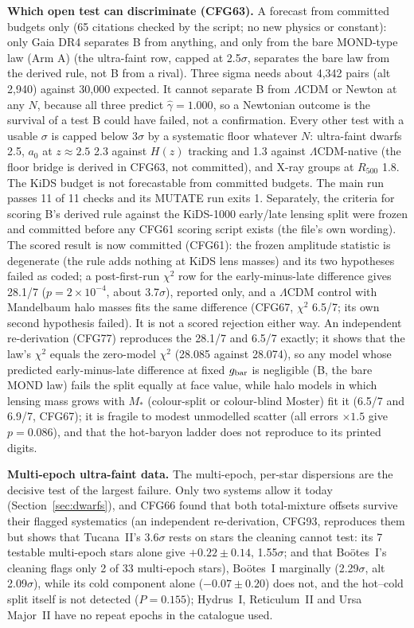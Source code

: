 \documentclass[10pt]{article}
\begin{document}
\textbf{Which open test can discriminate (CFG63).} A forecast from committed budgets only (65 citations checked by the script; no new physics or constant): only Gaia DR4 separates B from anything, and only from the bare MOND-type law (Arm A) (the ultra-faint row, capped at 2.5$\sigma$, separates the bare law from the derived rule, not B from a rival). Three sigma needs about 4,342 pairs (alt 2,940) against 30,000 expected. It cannot separate B from $\Lambda$CDM or Newton at any $N$, because all three predict $\hat\gamma=1.000$, so a Newtonian outcome is the survival of a test B could have failed, not a confirmation. Every other test with a usable $\sigma$ is capped below 3$\sigma$ by a systematic floor whatever $N$: ultra-faint dwarfs 2.5, $a_0$ at $z\approx2.5$ 2.3 against $H(z)$ tracking and 1.3 against $\Lambda$CDM-native (the floor bridge is derived in CFG63, not committed), and X-ray groups at $R_{500}$ 1.8. The KiDS budget is not forecastable from committed budgets. The main run passes 11 of 11 checks and its MUTATE run exits 1. Separately, the criteria for scoring B's derived rule against the KiDS-1000 early/late lensing split were frozen and committed before any CFG61 scoring script exists (the file's own wording). The scored result is now committed (CFG61): the frozen amplitude statistic is degenerate (the rule adds nothing at KiDS lens masses) and its two hypotheses failed as coded; a post-first-run $\chi^2$ row for the early-minus-late difference gives 28.1/7 ($p=2\times10^{-4}$, about 3.7$\sigma$), reported only, and a $\Lambda$CDM control with Mandelbaum halo masses fits the same difference (CFG67, $\chi^2$ 6.5/7; its own second hypothesis failed). It is not a scored rejection either way. An independent re-derivation (CFG77) reproduces the 28.1/7 and 6.5/7 exactly; it shows that the law's $\chi^2$ equals the zero-model $\chi^2$ (28.085 against 28.074), so any model whose predicted early-minus-late difference at fixed $g_{\rm bar}$ is negligible (B, the bare MOND law) fails the split equally at face value, while halo models in which lensing mass grows with $M_*$ (colour-split or colour-blind Moster) fit it (6.5/7 and 6.9/7, CFG67); it is fragile to modest unmodelled scatter (all errors $\times1.5$ give $p=0.086$), and that the hot-baryon ladder does not reproduce to its printed digits.

\textbf{Multi-epoch ultra-faint data.} The multi-epoch, per-star dispersions are the decisive test of the largest failure. Only two systems allow it today (Section~\ref{sec:dwarfs}), and CFG66 found that both total-mixture offsets survive their flagged systematics (an independent re-derivation, CFG93, reproduces them but shows that Tucana~II's 3.6$\sigma$ rests on stars the cleaning cannot test: its 7 testable multi-epoch stars alone give $+0.22\pm0.14$, 1.55$\sigma$; and that Bo\"otes~I's cleaning flags only 2 of 33 multi-epoch stars), Bo\"otes~I marginally (2.29$\sigma$, alt 2.09$\sigma$), while its cold component alone ($-0.07\pm0.20$) does not, and the hot--cold split itself is not detected ($P=0.155$); Hydrus~I, Reticulum~II and Ursa Major~II have no repeat epochs in the catalogue used.
\end{document}
